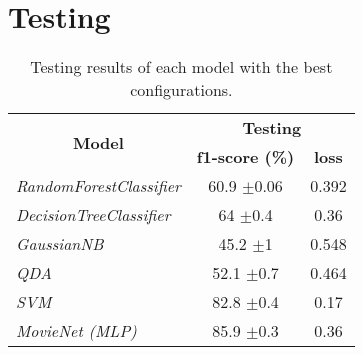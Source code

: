 \documentclass[../main]{subfiles}
\begin{document}
\section{Testing}
\begin{table}[!h]
    \center
    \begin{tabular}{|l|cc|}
        \hline
        \multicolumn{1}{|c|}{\multirow{2}{*}{\textbf{Model}}} & \multicolumn{2}{c|}{\textbf{Testing}}               \\
        \cline{2-3} 
        \multicolumn{1}{|c|}{}                                & \multicolumn{1}{c|}{\textbf{f1-score (\%)}} & \textbf{loss}  \\ 
        \hline
        \textit{RandomForestClassifier}                       & \multicolumn{1}{c|}{60.9 $\pm$0.06}             & 0.392 \\
        \hline
        \textit{DecisionTreeClassifier}                       & \multicolumn{1}{c|}{64 $\pm$0.4}                & 0.36  \\
        \hline
        \textit{GaussianNB}                                   & \multicolumn{1}{c|}{45.2 $\pm$1}                & 0.548 \\
        \hline
        \textit{QDA}                                          & \multicolumn{1}{c|}{52.1 $\pm$0.7}              & 0.464 \\
        \hline
        \textit{SVM}                                          & \multicolumn{1}{c|}{82.8 $\pm$0.4}              & 0.17  \\
        \hline
        \textit{MovieNet (MLP)}                                     & \multicolumn{1}{c|}{85.9 $\pm$0.3}              & 0.36  \\ \hline
    \end{tabular}
    \caption{Testing results of each model with the best configurations.}
    \label{table:test_results}
\end{table}
\end{document}
